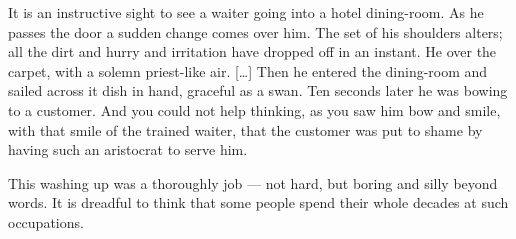 \documentclass{fiche}
\begin{document}
\begin{texte}
It is an instructive sight to see a waiter going into a hotel dining-room. As he passes the
door a sudden change comes over him. The set of his shoulders alters; all the dirt and hurry
and irritation have dropped off in an instant. He  over the
carpet, with a solemn priest-like air. [\ldots] Then he entered the dining-room and sailed
across it dish in hand, graceful as a swan. Ten seconds later he was bowing
 to a customer. And you could not help thinking, as
you saw him bow and smile, with that  smile of the trained
waiter, that the customer was put to shame by having such an aristocrat to serve him.

This washing up was a thoroughly  job --- not hard, but
boring and silly beyond words. It is dreadful to think that some people spend their whole
decades at such occupations.
\end{texte}

\end{document}

